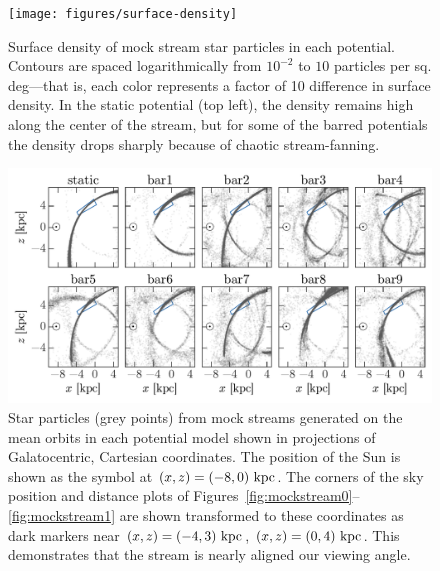 \documentclass[letterpaper,12pt,preprint]{aastex}
\begin{document}
\clearpage
\begin{figure}[p]
\begin{center}
\texttt{[image: figures/surface-density]}
\caption{ Surface density of mock stream star particles in each potential. Contours are spaced logarithmically from $10^{-2}$ to $10$ particles per sq. deg---that is, each color represents a factor of 10 difference in surface density. In the static potential (top left), the density remains high along the center of the stream, but for some of the barred potentials the density drops sharply because of chaotic stream-fanning.}
\label{fig:surfacedensity}
\end{center}
\end{figure}

\clearpage
\begin{figure}[p]
\begin{center}
\includegraphics[width=\textwidth]{figures/mockstream-xyz}
\caption{ Star particles (grey points) from mock streams generated on the mean orbits in each potential model shown in projections of Galatocentric, Cartesian coordinates. The position of the Sun is shown as the symbol at $(x,z)=(-8,0)~{\rm kpc}$. The corners of the sky position and distance plots of Figures~\ref{fig:mockstream0}--\ref{fig:mockstream1} are shown transformed to these coordinates as dark markers near $(x,z)=(-4,3)~{\rm kpc}$, $(x,z)=(0,4)~{\rm kpc}$. This demonstrates that the stream is nearly aligned our viewing angle. }
\label{fig:mockstreamxyz}
\end{center}
\end{figure}

\end{document}
